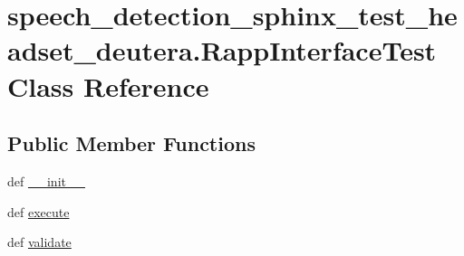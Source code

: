 \hypertarget{classspeech__detection__sphinx__test__headset__deutera_1_1RappInterfaceTest}{\section{speech\-\_\-detection\-\_\-sphinx\-\_\-test\-\_\-headset\-\_\-deutera.\-Rapp\-Interface\-Test Class Reference}
\label{classspeech__detection__sphinx__test__headset__deutera_1_1RappInterfaceTest}
}
\subsection*{Public Member Functions}
\begin{DoxyCompactItemize}
\item 
def \hyperlink{classspeech__detection__sphinx__test__headset__deutera_1_1RappInterfaceTest_a72c99134c54f9e16340d0a2c01d0a6c6}{\-\_\-\-\_\-init\-\_\-\-\_\-}
\item 
def \hyperlink{classspeech__detection__sphinx__test__headset__deutera_1_1RappInterfaceTest_a35f3d672f04cb2437d8d06201bd7dd97}{execute}
\item 
def \hyperlink{classspeech__detection__sphinx__test__headset__deutera_1_1RappInterfaceTest_a75aed35cf08ea7e2c025b565c4a4c19d}{validate}
\end{DoxyCompactItemize}
